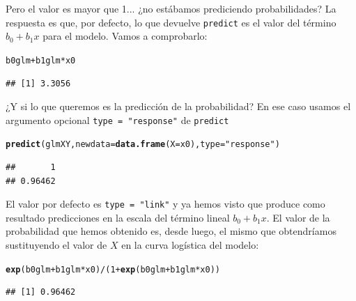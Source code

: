 \documentclass[10pt,a4paper]{article}\usepackage[]{graphicx}\usepackage[]{color}
\makeatletter
\newcommand{\hlnum}[1]{\textcolor[rgb]{0.686,0.059,0.569}{#1}}%
\newcommand{\hlstr}[1]{\textcolor[rgb]{0.192,0.494,0.8}{#1}}%
\newcommand{\hlopt}[1]{\textcolor[rgb]{0,0,0}{#1}}%
\newcommand{\hlstd}[1]{\textcolor[rgb]{0.345,0.345,0.345}{#1}}%
\newcommand{\hlkwc}[1]{\textcolor[rgb]{0.333,0.667,0.333}{#1}}%
\newcommand{\hlkwd}[1]{\textcolor[rgb]{0.737,0.353,0.396}{\textbf{#1}}}%
\newenvironment{kframe}{%
 \def\at@end@of@kframe{}%
 \ifinner\ifhmode%
  \def\at@end@of@kframe{\end{minipage}}%
  \begin{minipage}{\columnwidth}%
 \fi\fi%
 \def\FrameCommand##1{\hskip\@totalleftmargin \hskip-\fboxsep
 \colorbox{shadecolor}{##1}\hskip-\fboxsep
     \hskip-\linewidth \hskip-\@totalleftmargin \hskip\columnwidth}%
 \MakeFramed {\advance\hsize-\width
   \@totalleftmargin\z@ \linewidth\hsize
   \@setminipage}}%
 {\par\unskip\endMakeFramed%
 \at@end@of@kframe}
\newenvironment{knitrout}{}{} %
\makeatother
\begin{document}
Pero el valor es mayor que 1... ¿no estábamos prediciendo probabilidades? La respuesta es que, por defecto, lo que devuelve {\tt predict} es el valor del término $b_0 + b_1 x$ para el modelo. Vamos a comprobarlo:

\begin{knitrout}
\color{fgcolor}\begin{kframe}
\begin{alltt}
\hlstd{b0glm} \hlopt{+} \hlstd{b1glm} \hlopt{*} \hlstd{x0}
\end{alltt}
\begin{verbatim}
## [1] 3.3056
\end{verbatim}
\end{kframe}
\end{knitrout}

¿Y si lo que queremos es la predicción de la probabilidad? En ese caso usamos el argumento opcional \verb#type = "response"# de {\tt predict}

\begin{knitrout}
\color{fgcolor}\begin{kframe}
\begin{alltt}
\hlkwd{predict}\hlstd{(glmXY,} \hlkwc{newdata} \hlstd{=} \hlkwd{data.frame}\hlstd{(}\hlkwc{X}\hlstd{=x0),} \hlkwc{type} \hlstd{=} \hlstr{"response"}\hlstd{)}
\end{alltt}
\begin{verbatim}
##       1 
## 0.96462
\end{verbatim}
\end{kframe}
\end{knitrout}

El valor por defecto es \verb#type = "link"#  y ya hemos visto que produce como resultado predicciones en la escala del término lineal $b_0 + b_1 x$. El valor de la probabilidad que hemos obtenido es, desde luego, el mismo que obtendríamos sustituyendo el valor de $X$ en la curva logística del modelo:

\begin{knitrout}
\color{fgcolor}\begin{kframe}
\begin{alltt}
\hlkwd{exp}\hlstd{(b0glm} \hlopt{+} \hlstd{b1glm} \hlopt{*} \hlstd{x0)} \hlopt{/} \hlstd{(}\hlnum{1} \hlopt{+} \hlkwd{exp}\hlstd{(b0glm} \hlopt{+} \hlstd{b1glm} \hlopt{*} \hlstd{x0))}
\end{alltt}
\begin{verbatim}
## [1] 0.96462
\end{verbatim}
\end{kframe}
\end{knitrout}
\end{document}
